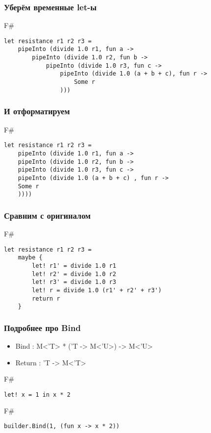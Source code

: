 \documentclass[xetex,mathserif,serif]{beamer}
\begin{document}
	\begin{frame}[fragile]
		\frametitle{Уберём временные let-ы}
		\begin{exampleblock}{F\#}
			\begin{verbatim}
let resistance r1 r2 r3 = 
    pipeInto (divide 1.0 r1, fun a ->
        pipeInto (divide 1.0 r2, fun b ->
            pipeInto (divide 1.0 r3, fun c ->
                pipeInto (divide 1.0 (a + b + c), fun r ->
                    Some r
                )))
			\end{verbatim}
		\end{exampleblock}
\end{frame}

	\begin{frame}[fragile]
		\frametitle{И отформатируем}
		\begin{exampleblock}{F\#}
			\begin{verbatim}
let resistance r1 r2 r3 = 
    pipeInto (divide 1.0 r1, fun a ->
    pipeInto (divide 1.0 r2, fun b ->
    pipeInto (divide 1.0 r3, fun c ->
    pipeInto (divide 1.0 (a + b + c) , fun r ->
    Some r
    ))))
			\end{verbatim}
		\end{exampleblock}
\end{frame}

	\begin{frame}[fragile]
		\frametitle{Сравним с оригиналом}
		\begin{exampleblock}{F\#}
			\begin{verbatim}
let resistance r1 r2 r3 = 
    maybe {
        let! r1' = divide 1.0 r1
        let! r2' = divide 1.0 r2
        let! r3' = divide 1.0 r3
        let! r = divide 1.0 (r1' + r2' + r3')
        return r
    }
			\end{verbatim}
		\end{exampleblock}
\end{frame}

	\begin{frame}[fragile]
		\frametitle{Подробнее про Bind}
		\begin{itemize}
			\item Bind : M<'T> * ('T -> M<'U>) -> M<'U>
			\item Return : 'T -> M<'T>
		\end{itemize}
		\begin{exampleblock}{F\#}
			\begin{verbatim}
let! x = 1 in x * 2
			\end{verbatim}
		\end{exampleblock}
		\begin{exampleblock}{F\#}
			\begin{verbatim}
builder.Bind(1, (fun x -> x * 2))
			\end{verbatim}
		\end{exampleblock}
\end{frame}
\end{document}
